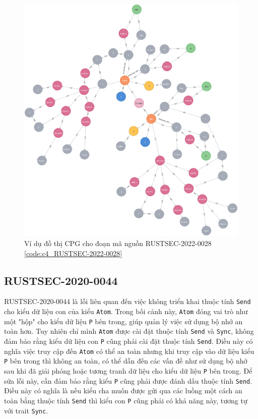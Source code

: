 \begin{figure}[H]
    \includegraphics[width=1\columnwidth]{figures/c4/c4_RUSTSEC-2022-0028.png}
    \centering
    \caption{Ví dụ đồ thị CPG cho đoạn mã nguồn RUSTSEC-2022-0028 \ref{code:c4_RUSTSEC-2022-0028}}
    \label{img:c4_RUSTSEC-2022-0028}
\end{figure}

\subsection{RUSTSEC-2020-0044}

RUSTSEC-2020-0044 là lỗi liên quan đến việc không triển khai thuộc tính \texttt{Send} cho kiểu dữ liệu con của kiểu \texttt{Atom}.
Trong bối cảnh này, \texttt{Atom} đóng vai trò như một "hộp" cho kiểu dữ liệu \texttt{P} bên trong, giúp quản lý việc sử dụng bộ nhớ an toàn hơn.
Tuy nhiên chỉ mình \texttt{Atom} được cài đặt thuộc tính \texttt{Send} và \texttt{Sync}, không đảm bảo rằng kiểu dữ liệu con \texttt{P} cũng phải cài đặt thuộc tính \texttt{Send}.
Điều này có nghĩa việc truy cập đến \texttt{Atom} có thể an toàn nhưng khi truy cập vào dữ liệu kiểu \texttt{P} bên trong thì không an toàn, có thể dẫn đến các vấn đề như sử dụng bộ nhớ sau khi đã giải phóng hoặc tương tranh dữ liệu cho kiểu dữ liệu \texttt{P} bên trong.
Để sửa lỗi này, cần đảm bảo rằng kiểu \texttt{P} cũng phải được đánh dấu thuộc tính \texttt{Send}.
Điều này có nghĩa là nếu kiểu cha muốn được gửi qua các luồng một cách an toàn bằng thuộc tính \texttt{Send} thì kiểu con \texttt{P} cũng phải có khả năng này, tương tự với trait \texttt{Sync}.

